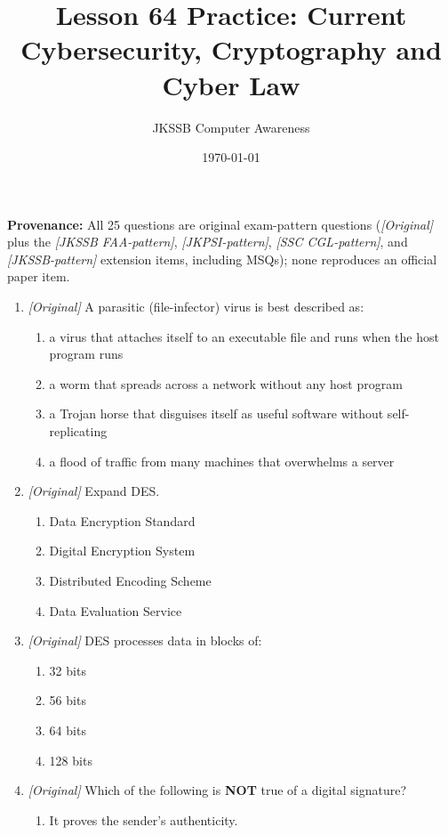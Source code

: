 \documentclass[11pt]{article}
\title{Lesson 64 Practice: Current Cybersecurity, Cryptography and Cyber Law}
\author{JKSSB Computer Awareness}
\date{\today}
\begin{document}
\maketitle
\noindent\textbf{Provenance:} All 25 questions are original exam-pattern questions (\textit{[Original]} plus the \textit{[JKSSB FAA-pattern]}, \textit{[JKPSI-pattern]}, \textit{[SSC CGL-pattern]}, and \textit{[JKSSB-pattern]} extension items, including MSQs); none reproduces an official paper item.

\begin{enumerate}[label=\textbf{Q\arabic*.}, leftmargin=*]
\item \textit{[Original]} A parasitic (file-infector) virus is best described as:
  \begin{enumerate}[label=\Alph*.]
    \item a virus that attaches itself to an executable file and runs when the host program runs
    \item a worm that spreads across a network without any host program
    \item a Trojan horse that disguises itself as useful software without self-replicating
    \item a flood of traffic from many machines that overwhelms a server
  \end{enumerate}
\item \textit{[Original]} Expand DES.
  \begin{enumerate}[label=\Alph*.]
    \item Data Encryption Standard
    \item Digital Encryption System
    \item Distributed Encoding Scheme
    \item Data Evaluation Service
  \end{enumerate}
\item \textit{[Original]} DES processes data in blocks of:
  \begin{enumerate}[label=\Alph*.]
    \item 32 bits
    \item 56 bits
    \item 64 bits
    \item 128 bits
  \end{enumerate}
\item \textit{[Original]} Which of the following is \textbf{NOT} true of a digital signature?
  \begin{enumerate}[label=\Alph*.]
    \item It proves the sender's authenticity.

\end{enumerate}
\end{enumerate}
\end{document}
